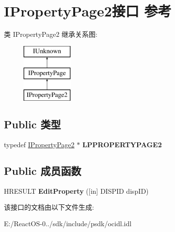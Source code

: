 \hypertarget{interface_i_property_page2}{}\section{I\+Property\+Page2接口 参考}
\label{interface_i_property_page2}
类 I\+Property\+Page2 继承关系图\+:\begin{figure}[H]
\begin{center}
\leavevmode
\includegraphics[height=3.000000cm]{interface_i_property_page2}
\end{center}
\end{figure}
\subsection*{Public 类型}
\begin{DoxyCompactItemize}
\item 
\mbox{\label{interface_i_property_page2_a04ca50528245d11359bb3f87a3cddea0}} 
typedef \hyperlink{interface_i_property_page2}{I\+Property\+Page2} $\ast$ {\bfseries L\+P\+P\+R\+O\+P\+E\+R\+T\+Y\+P\+A\+G\+E2}
\end{DoxyCompactItemize}
\subsection*{Public 成员函数}
\begin{DoxyCompactItemize}
\item 
\mbox{\label{interface_i_property_page2_a201d7fb5bbe52271e9e085640200769b}} 
H\+R\+E\+S\+U\+LT {\bfseries Edit\+Property} (\mbox{[}in\mbox{]} D\+I\+S\+P\+ID disp\+ID)
\end{DoxyCompactItemize}


该接口的文档由以下文件生成\+:\begin{DoxyCompactItemize}
\item 
E\+:/\+React\+O\+S-\/0../sdk/include/psdk/ocidl.\+idl\end{DoxyCompactItemize}
